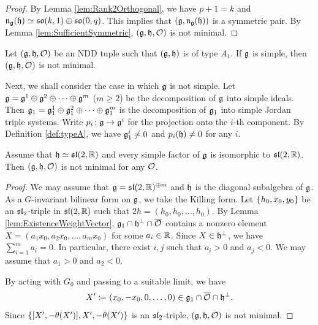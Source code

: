 \begin{proof}
	By Lemma \ref{lem:Rank2Orthogonal}, we have $p+1 = k$ and $\mathfrak{n}_{\mathfrak{g}}(\mathfrak{h}) \simeq \mathfrak{so}(k, 1) \oplus \mathfrak{so}(0, q)$.
	This implies that $(\mathfrak{g}, \mathfrak{n}_{\mathfrak{g}}(\mathfrak{h}))$ is a symmetric pair.
	By Lemma \ref{lem:SufficientSymmetric}, $(\mathfrak{g}, \mathfrak{h}, \mathcal{O})$ is not minimal.
\end{proof}

\begin{theorem} \label{thm:NonMinimalTypeASimple}
	Let $(\mathfrak{g}, \mathfrak{h}, \mathcal{O})$ be an NDD tuple such that $(\mathfrak{g}, \mathfrak{h})$ is of type $A_1$.
	If $\mathfrak{g}$ is simple, then $(\mathfrak{g}, \mathfrak{h}, \mathcal{O})$ is not minimal.
\end{theorem}

Next, we shall consider the case in which $\mathfrak{g}$ is not simple.
Let $\mathfrak{g} = \mathfrak{g}^1\oplus \mathfrak{g}^2 \oplus \cdots \oplus \mathfrak{g}^m$ ($m \geq 2$) be the decomposition of $\mathfrak{g}$ into simple ideals.
Then $\mathfrak{g}_1 = \mathfrak{g}_1^1 \oplus \mathfrak{g}_1^2 \oplus \cdots \oplus \mathfrak{g}_1^m$ is the decomposition of $\mathfrak{g}_1$ into simple Jordan triple systems.
Write $p_i\colon \mathfrak{g} \rightarrow \mathfrak{g}^i$ for the projection onto the $i$-th component.
By Definition \ref{def:typeA}, we have $\mathfrak{g}_1^i \neq 0$ and $p_i(\mathfrak{h}) \neq 0$ for any $i$.

\begin{lemma} \label{lem:SL2DirectSum}
	Assume that $\mathfrak{h} \simeq \mathfrak{sl}(2,\mathbb{R})$ and every simple factor of $\mathfrak{g}$ is isomorphic to $\mathfrak{sl}(2,\mathbb{R})$.
	Then $(\mathfrak{g}, \mathfrak{h}, \mathcal{O})$ is not minimal for any $\mathcal{O}$.
\end{lemma}

\begin{proof}
	We may assume that $\mathfrak{g} = \mathfrak{sl}(2,\mathbb{R})^{\oplus m}$ and $\mathfrak{h}$ is the diagonal subalgebra of $\mathfrak{g}$.
	As a $G$-invariant bilinear form on $\mathfrak{g}$, we take the Killing form.
	Let $\left\{h_0, x_0, y_0 \right\}$ be an $\mathfrak{sl}_2$-triple in $\mathfrak{sl}(2,\mathbb{R})$ such that $2h = (h_0, h_0, \ldots, h_0)$.
	By Lemma \ref{lem:ExistenceWeightVector}, $\mathfrak{g}_1 \cap \mathfrak{h}^\perp \cap \overline{\mathcal{O}}$ contains
	a nonzero element $X = (a_1 x_0, a_2 x_0, \ldots, a_m x_0)$ for some $a_i \in \mathbb{R}$.
	Since $X \in \mathfrak{h}^\perp$, we have $\sum_{i=1}^m a_i = 0$.
	In particular, there exist $i, j$ such that $a_i > 0$ and $a_j < 0$.
	We may assume that $a_1 > 0$ and $a_2 < 0$.

	By acting with $G_0$ and passing to a suitable limit, we have
	\begin{align*}
		X' \coloneq (x_0, -x_0, 0, \ldots, 0) \in \mathfrak{g}_1\cap \overline{\mathcal{O}}\cap \mathfrak{h}^\perp.
	\end{align*}
	Since $\left\{[X', -\theta(X')], X', -\theta(X') \right\}$ is an $\mathfrak{sl}_2$-triple, $(\mathfrak{g}, \mathfrak{h}, \mathcal{O})$ is not minimal.
\end{proof}

